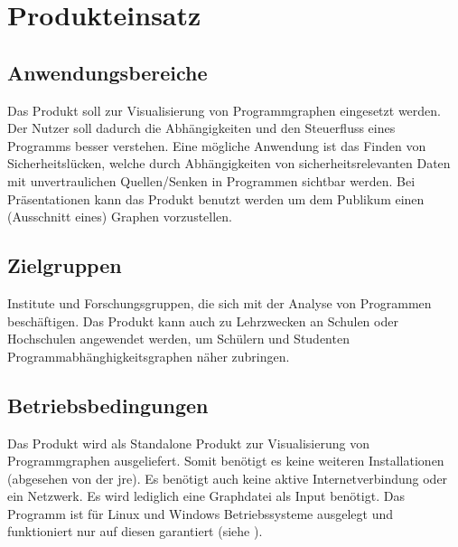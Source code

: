 \chapter{Produkteinsatz}\label{ch:einsatz}

\section{Anwendungsbereiche}
Das Produkt soll zur Visualisierung von Programmgraphen eingesetzt werden.
Der Nutzer soll dadurch die Abhängigkeiten und den Steuerfluss eines Programms besser verstehen.
Eine mögliche Anwendung ist das Finden von Sicherheitslücken, welche durch Abhängigkeiten von sicherheitsrelevanten Daten mit unvertraulichen Quellen/Senken in Programmen sichtbar werden.
Bei Präsentationen kann das Produkt benutzt werden um dem Publikum einen (Ausschnitt eines) Graphen vorzustellen.

\section{Zielgruppen}
Institute und Forschungsgruppen, die sich mit der Analyse von Programmen beschäftigen.
Das Produkt kann auch zu Lehrzwecken an Schulen oder Hochschulen angewendet werden, um Schülern und Studenten Programmabhänghigkeitsgraphen näher zubringen.

\section{Betriebsbedingungen}
Das Produkt wird als Standalone Produkt zur Visualisierung von Programmgraphen ausgeliefert.
Somit benötigt es keine weiteren Installationen (abgesehen von der \gls{jre}).
Es benötigt auch keine aktive Internetverbindung oder ein Netzwerk.
Es wird lediglich eine Graphdatei als Input benötigt.
Das Programm ist für Linux und Windows Betriebssysteme ausgelegt und funktioniert nur auf diesen garantiert (siehe ).
